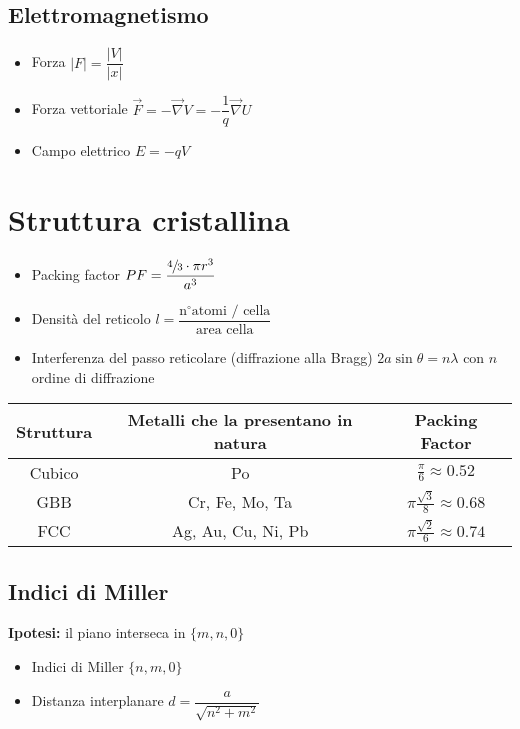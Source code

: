 \documentclass{article}
\begin{document}
\subsection{Elettromagnetismo}
\begin{itemize}
  \item Forza \( |F| = \dfrac{|V|}{|x|} \)
  \item Forza vettoriale \( \vec{F} = - \vec{\nabla} V = -\dfrac{1}{q} \vec{\nabla} U \)
  \item Campo elettrico \( E = -q V \)
\end{itemize}

\section{Struttura cristallina}
\begin{itemize}
  \item Packing factor \( PF = \dfrac{ \sfrac{4}{3} \cdot \pi r^3}{a^3} \)
  \item Densità del reticolo \( l = \dfrac{\text{n} ^ \circ \text{atomi / cella}}{\text{area cella}} \)
  \item Interferenza del passo reticolare (diffrazione alla Bragg) \(  2a \sin \theta = n \lambda \) con \( n \) ordine di diffrazione
\end{itemize}

\vspace{1cm}
\renewcommand{\arraystretch}{2}
\begin{center}
  \begin{tabular}{|c|c|c|}
    \hline
    \textbf{Struttura} & \textbf{Metalli che la presentano in natura} & \textbf{Packing Factor}                  \\
    \hline
    Cubico             & Po                                           & \(\frac{\pi}{6} \approx 0.52 \)          \\
    \hline
    GBB                & Cr, Fe, Mo, Ta                               & \(\pi \frac{\sqrt{3}}{8} \approx 0.68 \) \\
    \hline
    FCC                & Ag, Au, Cu, Ni, Pb                           & \(\pi \frac{\sqrt{2}}{6} \approx 0.74 \) \\
    \hline
  \end{tabular}
\end{center}
\renewcommand{\arraystretch}{1}
\vspace{1cm}

\newpage

\subsection{Indici di Miller}
\textbf{Ipotesi:} il piano interseca in \( \{m, n, 0\} \)
\begin{itemize}
  \item Indici di Miller \( \{n, m, 0\} \)
  \item Distanza interplanare \( d = \dfrac{a}{\sqrt{n^2+m^2}} \)
\end{itemize}
\end{document}
